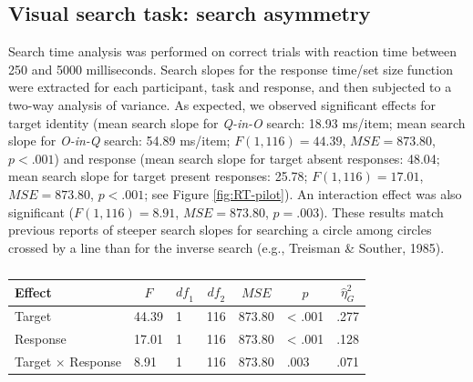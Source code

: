 \documentclass[
  english,
  man,floatsintext]{apa6}
\begin{document}
\hypertarget{visual-search-task-search-asymmetry}{%
\subsection{Visual search task: search asymmetry}\label{visual-search-task-search-asymmetry}}

Search time analysis was performed on correct trials with reaction time between 250 and 5000 milliseconds. Search slopes for the response time/set size function were extracted for each participant, task and response, and then subjected to a two-way analysis of variance. As expected, we observed significant effects for target identity (mean search slope for \emph{Q-in-O} search: 18.93 ms/item; mean search slope for \emph{O-in-Q} search: 54.89 ms/item; \(F(1, 116) = 44.39\), \(\mathit{MSE} = 873.80\), \(p < .001\)) and response (mean search slope for target absent responses: 48.04; mean search slope for target present responses: 25.78; \(F(1, 116) = 17.01\), \(\mathit{MSE} = 873.80\), \(p < .001\); see Figure \ref{fig:RT-pilot}). An interaction effect was also significant (\(F(1, 116) = 8.91\), \(\mathit{MSE} = 873.80\), \(p = .003\)). These results match previous reports of steeper search slopes for searching a circle among circles crossed by a line than for the inverse search (e.g., Treisman \& Souther, 1985).

\begin{table}[tbp]

\begin{center}
\begin{threeparttable}

\caption{\label{tab:search_analysis}}

\begin{tabular}{lllllll}
\toprule
Effect & \multicolumn{1}{c}{$F$} & \multicolumn{1}{c}{$\mathit{df}_1$} & \multicolumn{1}{c}{$\mathit{df}_2$} & \multicolumn{1}{c}{$\mathit{MSE}$} & \multicolumn{1}{c}{$p$} & \multicolumn{1}{c}{$\hat{\eta}^2_G$}\\
\midrule
Target & 44.39 & 1 & 116 & 873.80 & < .001 & .277\\
Response & 17.01 & 1 & 116 & 873.80 & < .001 & .128\\
Target $\times$ Response & 8.91 & 1 & 116 & 873.80 & .003 & .071\\
\bottomrule
\end{tabular}

\end{threeparttable}
\end{center}

\end{table}
\end{document}

